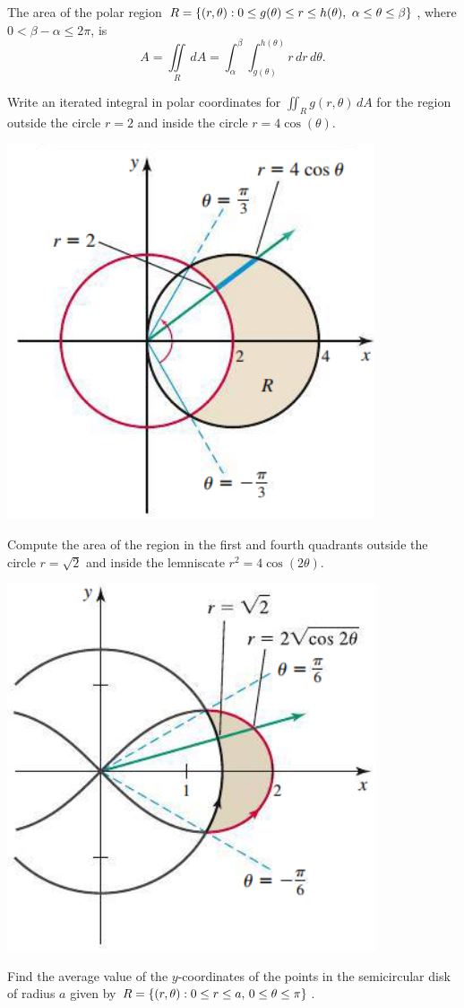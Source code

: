 \documentclass[mathNotesPreamble]{subfiles}
\begin{document}
  \begin{thmBox*}
    The area of the polar region $R={\left\{(r,\theta): 0\leq g(\theta)\leq r\leq h(\theta),\ \alpha\leq \theta\leq\beta\right\}}$, where $0<\beta-\alpha\leq 2\pi$, is
      \[A=\iint\limits_R\,dA=\int_\alpha^\beta \int_{g(\theta)}^{h(\theta)}r\,dr\,d\theta.\]
  \end{thmBox*}
  \pagebreak

  \begin{ex*}
    Write an iterated integral in polar coordinates for $\iint_R g(r,\theta)\,dA$ for the region outside the circle $r=2$ and inside the circle $r=4\cos(\theta)$.
  \end{ex*}
  \begin{flushright}
    \includegraphics[width=0.35\linewidth]{images/briggs_16_03/fig16_35}
  \end{flushright}
  \pagebreak

  \begin{ex*}
    Compute the area of the region in the first and fourth quadrants outside the circle $r=\sqrt{2}$ and inside the lemniscate $r^2=4\cos(2\theta)$.
  \end{ex*}
  \begin{flushright}
    \includegraphics[width=0.35\linewidth]{images/briggs_16_03/fig16_37}
  \end{flushright}
  \pagebreak

  \begin{ex*}
    Find the average value of the $y$-coordinates of the points in the semicircular disk of radius $a$ given by $R={\left\{(r,\theta): 0\leq r\leq a,\, 0\leq\theta\leq\pi\right\}}$.
  \end{ex*}
  \pagebreak
\end{document}
